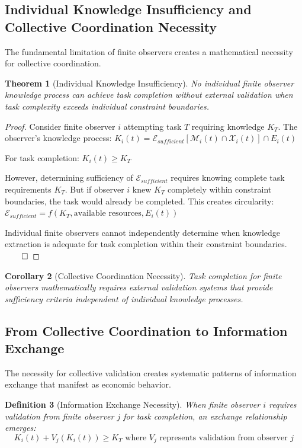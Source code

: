 \documentclass[12pt,a4paper]{article}
\newtheorem{theorem}{Theorem}
\newtheorem{corollary}[theorem]{Corollary}
\newtheorem{definition}[theorem]{Definition}
\begin{document}
\subsection{Individual Knowledge Insufficiency and Collective Coordination Necessity}

The fundamental limitation of finite observers creates a mathematical necessity for collective coordination.

\begin{theorem}[Individual Knowledge Insufficiency]
No individual finite observer knowledge process can achieve task completion without external validation when task complexity exceeds individual constraint boundaries.
\end{theorem}

\begin{proof}
Consider finite observer $i$ attempting task $T$ requiring knowledge $K_T$. The observer's knowledge process:
$K_i(t) = \mathcal{E}_{sufficient}[\mathcal{M}_i(t) \cap \mathcal{X}_i(t)] \cap E_i(t)$

For task completion: $K_i(t) \geq K_T$

However, determining sufficiency of $\mathcal{E}_{sufficient}$ requires knowing complete task requirements $K_T$. But if observer $i$ knew $K_T$ completely within constraint boundaries, the task would already be completed. This creates circularity:
$\mathcal{E}_{sufficient} = f(K_T, \text{available resources}, E_i(t))$

Individual finite observers cannot independently determine when knowledge extraction is adequate for task completion within their constraint boundaries. $\qed$
\end{proof}

\begin{corollary}[Collective Coordination Necessity]
Task completion for finite observers mathematically requires external validation systems that provide sufficiency criteria independent of individual knowledge processes.
\end{corollary}

\subsection{From Collective Coordination to Information Exchange}

The necessity for collective validation creates systematic patterns of information exchange that manifest as economic behavior.

\begin{definition}[Information Exchange Necessity]
When finite observer $i$ requires validation from finite observer $j$ for task completion, an exchange relationship emerges:
\begin{equation}
K_i(t) + V_j(K_i(t)) \geq K_{T} \text{ where } V_j \text{ represents validation from observer } j
\end{equation}
\end{definition}
\end{document}
